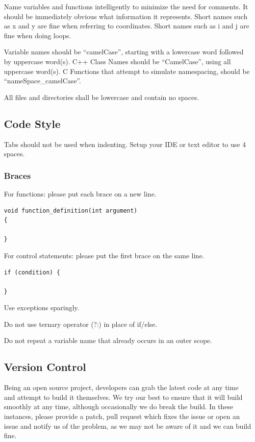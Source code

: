 \documentclass[a4paper, 11pt]{report}
\begin{document}
Name variables and functions intelligently to minimize the need for
comments. It should be immediately obvious what information it
represents. Short names such as x and y are fine when referring to
coordinates. Short names such as i and j are fine when doing loops.

Variable names should be ``camelCase'', starting with a lowercase word
followed by uppercase word(s). C++ Class Names should be ``CamelCase'',
using all uppercase word(s). C Functions that attempt to simulate
namespacing, should be ``nameSpace\_camelCase''.

All files and directories shall be lowercase and contain no spaces.

\hypertarget{code-style}{%
\subsection{Code Style}\label{code-style}}

Tabs should not be used when indenting. Setup your IDE or text editor to
use 4 spaces.

\hypertarget{braces}{%
\subsubsection{Braces}\label{braces}}

For functions: please put each brace on a new line.

\begin{verbatim}
void function_definition(int argument)
{

}
\end{verbatim}

For control statements: please put the first brace on the same line.

\begin{verbatim}
if (condition) {

}
\end{verbatim}

Use exceptions sparingly.

Do not use ternary operator (?:) in place of if/else.

Do not repeat a variable name that already occurs in an outer scope.

\hypertarget{version-control}{%
\subsection{Version Control}\label{version-control}}

Being an open source project, developers can grab the latest code at any
time and attempt to build it themselves. We try our best to ensure that
it will build smoothly at any time, although occasionally we do break
the build. In these instances, please provide a patch, pull request
which fixes the issue or open an issue and notify us of the problem, as
we may not be aware of it and we can build fine.
\end{document}
